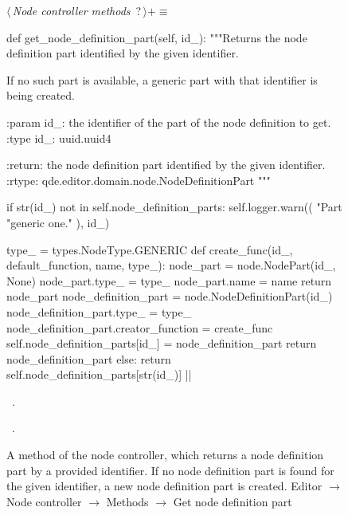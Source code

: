 \documentclass[%
    a4paper,    %
    justified,  %
    nobib,      %
    openany     %
]{tufte-book}
\begin{document}
\begin{figure}
\begin{flushleft} \small
\begin{minipage}{\linewidth}\label{scrap128}\raggedright\small
{} $\langle\,${\itshape Node controller methods}\nobreak\ {\footnotesize {?}}$\,\rangle+\equiv$
\vspace{-1ex}
\begin{pythoncode}
def get_node_definition_part(self, id_):
    """Returns the node definition part identified by the given identifier.

    If no such part is available, a generic part with that identifier is being
    created.

    :param id_: the identifier of the part of the node definition to get.
    :type  id_: uuid.uuid4

    :return: the node definition part identified by the given identifier.
    :rtype: qde.editor.domain.node.NodeDefinitionPart
    """

    if str(id_) not in self.node_definition_parts:
        self.logger.warn((
            "Part %
            "generic one."
        ), id_)

        type_ = types.NodeType.GENERIC
        def create_func(id_, default_function, name, type_):
            node_part = node.NodePart(id_, None)
            node_part.type_ = type_
            node_part.name = name
            return node_part
        node_definition_part = node.NodeDefinitionPart(id_)
        node_definition_part.type_ = type_
        node_definition_part.creator_function = create_func
        self.node_definition_parts[id_] = node_definition_part
        return node_definition_part
    else:
        return self.node_definition_parts[str(id_)]
|\NWsep|
\end{pythoncode}
\vspace{1.5ex}
\footnotesize
\begin{list}{}{\setlength{\itemsep}{-\parsep}\setlength{\itemindent}{-\leftmargin}}
\item \NWtxtMacroDefBy\ .
\item \NWtxtMacroRefIn\ .

\item{}
\end{list}
\end{minipage}\vspace{4ex}
\end{flushleft}
\caption{A method of the node controller, which returns a node definition part
  by a provided identifier. If no node definition part is found for the given
  identifier, a new node definition part is created.
  \newline{}\newline{}Editor $\rightarrow$ Node controller $\rightarrow$
  Methods $\rightarrow$ Get node definition part}
\label{editor:lst:node-controller:methods:get-node-definition-part}
\end{figure}
\end{document}
